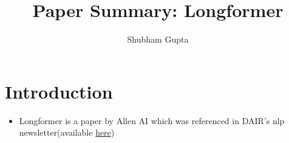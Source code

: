 \documentclass[a4paper]{article}
\title{Paper Summary: Longformer}
\author{Shubham Gupta}
\begin{document}
\maketitle
\section{Introduction}
\begin{itemize}
    \item Longformer is a paper by Allen AI which was referenced in DAIR's nlp newsletter(available \href{https://dair.ai/NLP_Newsletter_10_en/}{here})
\end{itemize}
\end{document}
